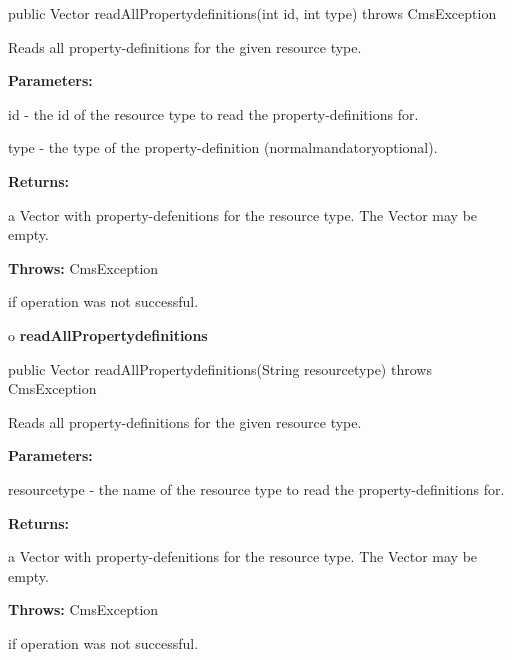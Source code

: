 \begin{PRE}
 public Vector readAllPropertydefinitions(int id,
                                          int type) throws CmsException
\end{PRE}

\begin{description}
\htmlDD Reads all property-definitions for the given resource type. 

\begin{description}
\item {\bf Parameters:}  

id - the id of the resource type to read the property-definitions for.  

type - the type of the property-definition
(normal{\htmlBar}mandatory{\htmlBar}optional).  
\item {\bf Returns:}  

a Vector with property-defenitions for the resource type. The Vector may be
empty.  
\item {\bf Throws:} CmsException  

if operation was not successful.  
\end{description}

\end{description}

o {\bf readAllPropertydefinitions} 

\begin{PRE}
 public Vector readAllPropertydefinitions(String resourcetype) throws CmsException
\end{PRE}

\begin{description}
\htmlDD Reads all property-definitions for the given resource type. 

\begin{description}
\item {\bf Parameters:}  

resourcetype - the name of the resource type to read the property-definitions
for.  
\item {\bf Returns:}  

a Vector with property-defenitions for the resource type. The Vector may be
empty.  
\item {\bf Throws:} CmsException  

if operation was not successful.  
\end{description}

\end{description}

